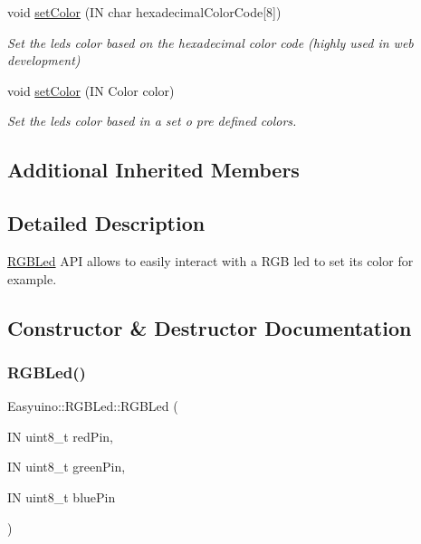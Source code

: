 \begin{DoxyCompactItemize}
void \hyperlink{class_easyuino_1_1_r_g_b_led_a7e1437d944d139f3246b92b17f207175}{set\+Color} (IN char hexadecimal\+Color\+Code\mbox{[}8\mbox{]})
\begin{DoxyCompactList}\small\item\em Set the led\textquotesingle{}s color based on the hexadecimal color code (highly used in web development) \end{DoxyCompactList}\item 
void \hyperlink{class_easyuino_1_1_r_g_b_led_a5b8365a4191bbe0a092ba30996a37b13}{set\+Color} (IN Color color)
\begin{DoxyCompactList}\small\item\em Set the led\textquotesingle{}s color based in a set o pre defined colors. \end{DoxyCompactList}\end{DoxyCompactItemize}
\subsection*{Additional Inherited Members}


\subsection{Detailed Description}
\hyperlink{class_easyuino_1_1_r_g_b_led}{R\+G\+B\+Led} A\+PI allows to easily interact with a R\+GB led to set its color for example. 

\subsection{Constructor \& Destructor Documentation}
\mbox{\label{class_easyuino_1_1_r_g_b_led_a3580be3110cebddcd06917994ebdb8ad}} 
\subsubsection{\texorpdfstring{R\+G\+B\+Led()}{RGBLed()}\hspace{0.1cm}{\footnotesize\ttfamily [1/2]}}
{\footnotesize\ttfamily Easyuino\+::\+R\+G\+B\+Led\+::\+R\+G\+B\+Led (\begin{DoxyParamCaption}\item[{IN uint8\+\_\+t}]{red\+Pin,  }\item[{IN uint8\+\_\+t}]{green\+Pin,  }\item[{IN uint8\+\_\+t}]{blue\+Pin }\end{DoxyParamCaption})}



